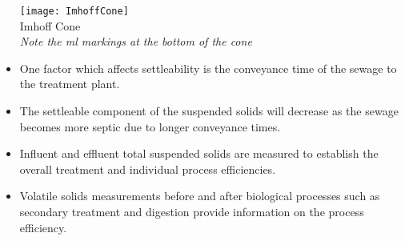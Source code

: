 \begin{itemize}
\begin{minipage}{0.5\textwidth}
			      \end{minipage}	
			      \begin{minipage}{0.5\textwidth}
			      	\begin{center}
			      		\texttt{[image: ImhoffCone]}\\
			      		Imhoff Cone\\
			      		\textit{Note the ml markings at the bottom of the cone}
			      		
			      		
			      	\end{center}
		      \end{minipage}
			      	\item One factor which affects settleability is the conveyance time of the sewage to the treatment plant. 			
			      	\item The settleable component of the suspended solids will decrease as the sewage becomes more septic due to longer conveyance times.
			\item Influent and effluent total suspended solids are measured to establish the overall treatment and individual process efficiencies.  
			\item Volatile solids measurements before and after biological processes such as secondary treatment and digestion provide information on the process efficiency.\\
		\end{itemize}

